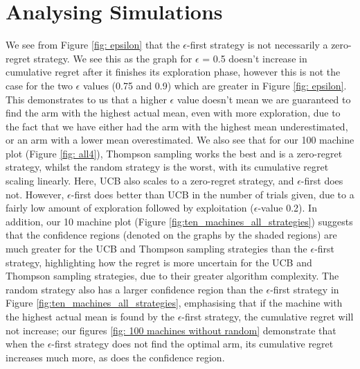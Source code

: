 \section{Analysing Simulations}\label{sec:analysing-simulations}
We see from Figure \ref{fig: epsilon} that the $\epsilon$-first strategy is not necessarily a zero-regret strategy.
We see this as the graph for $\epsilon$ = 0.5 doesn't increase in cumulative regret after it finishes its exploration phase, however this is not the case for the two $\epsilon$ values (0.75 and 0.9) which are greater in Figure \ref{fig: epsilon}.
This demonstrates to us that a higher $\epsilon$ value doesn't mean we are guaranteed to find the arm with the highest actual mean, even with more exploration, due to the fact that we have either had the arm with the highest mean underestimated, or an arm with a lower mean overestimated.
\newline
We also see that for our 100 machine plot (Figure \ref{fig: all4}), Thompson sampling works the best and is a zero-regret strategy, whilst the random strategy is the worst, with its cumulative regret scaling linearly.
Here, UCB also scales to a zero-regret strategy, and $\epsilon$-first does not.
However, $\epsilon$-first does better than UCB in the number of trials given, due to a fairly low amount of exploration followed by exploitation ($\epsilon$-value 0.2).
\newline
In addition, our 10 machine plot (Figure \ref{fig:ten_machines_all_strategies}) suggests that the confidence regions (denoted on the graphs by the shaded regions) are much greater for the UCB and Thompson sampling strategies than the $\epsilon$-first strategy, highlighting how the regret is more uncertain for the UCB and Thompson sampling strategies, due to their greater algorithm complexity.
The random strategy also has a larger confidence region than the $\epsilon$-first strategy in Figure \ref{fig:ten_machines_all_strategies}, emphasising that if the machine with the highest actual mean is found by the $\epsilon$-first strategy, the cumulative regret will not increase;
our figures \ref{fig: 100 machines without random} demonstrate that when the $\epsilon$-first strategy does not find the optimal arm, its cumulative regret increases much more, as does the confidence region.